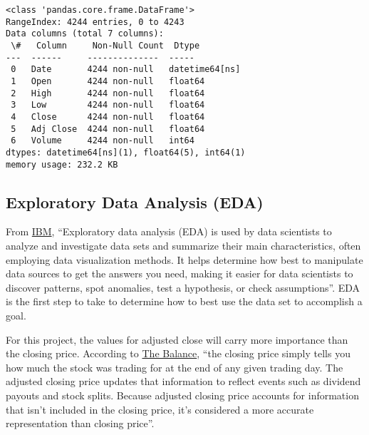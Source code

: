 \documentclass[11pt]{article}
\begin{document}
    \begin{Verbatim}[commandchars=\\\{\}]
<class 'pandas.core.frame.DataFrame'>
RangeIndex: 4244 entries, 0 to 4243
Data columns (total 7 columns):
 \#   Column     Non-Null Count  Dtype
---  ------     --------------  -----
 0   Date       4244 non-null   datetime64[ns]
 1   Open       4244 non-null   float64
 2   High       4244 non-null   float64
 3   Low        4244 non-null   float64
 4   Close      4244 non-null   float64
 5   Adj Close  4244 non-null   float64
 6   Volume     4244 non-null   int64
dtypes: datetime64[ns](1), float64(5), int64(1)
memory usage: 232.2 KB
    \end{Verbatim}

    \hypertarget{exploratory-data-analysis-eda}{%
\subsection{Exploratory Data Analysis
(EDA)}\label{exploratory-data-analysis-eda}}

From \href{https://www.ibm.com/topics/exploratory-data-analysis}{IBM},
``Exploratory data analysis (EDA) is used by data scientists to analyze
and investigate data sets and summarize their main characteristics,
often employing data visualization methods. It helps determine how best
to manipulate data sources to get the answers you need, making it easier
for data scientists to discover patterns, spot anomalies, test a
hypothesis, or check assumptions''. EDA is the first step to take to
determine how to best use the data set to accomplish a goal.

    For this project, the values for adjusted close will carry more
importance than the closing price. According to
\href{https://www.thebalancemoney.com/what-is-adjusted-closing-price-5190242}{The
Balance}, ``the closing price simply tells you how much the stock was
trading for at the end of any given trading day. The adjusted closing
price updates that information to reflect events such as dividend
payouts and stock splits. Because adjusted closing price accounts for
information that isn't included in the closing price, it's considered a
more accurate representation than closing price''.
\end{document}
